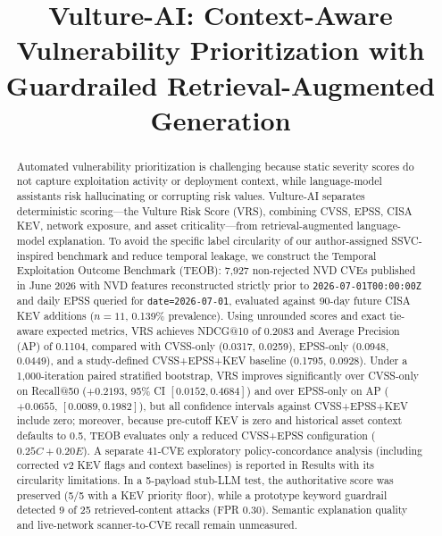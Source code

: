 \documentclass[conference]{IEEEtran}
\begin{document}
\title{Vulture-AI: Context-Aware Vulnerability Prioritization with Guardrailed Retrieval-Augmented Generation}

\author{
}

\maketitle

\begin{abstract}
Automated vulnerability prioritization is challenging because static severity scores do not capture exploitation activity or deployment context, while language-model assistants risk hallucinating or corrupting risk values. Vulture-AI separates deterministic scoring---the Vulture Risk Score (VRS), combining CVSS, EPSS, CISA KEV, network exposure, and asset criticality---from retrieval-augmented language-model explanation. To avoid the specific label circularity of our author-assigned SSVC-inspired benchmark and reduce temporal leakage, we construct the Temporal Exploitation Outcome Benchmark (TEOB): 7,927 non-rejected NVD CVEs published in June 2026 with NVD features reconstructed strictly prior to \texttt{2026-07-01T00:00:00Z} and daily EPSS queried for \texttt{date=2026-07-01}, evaluated against 90-day future CISA KEV additions ($n=11$, 0.139\% prevalence). Using unrounded scores and exact tie-aware expected metrics, VRS achieves NDCG@10 of 0.2083 and Average Precision (AP) of 0.1104, compared with CVSS-only (0.0317, 0.0259), EPSS-only (0.0948, 0.0449), and a study-defined CVSS+EPSS+KEV baseline (0.1795, 0.0928). Under a 1,000-iteration paired stratified bootstrap, VRS improves significantly over CVSS-only on Recall@50 ($+0.2193$, 95\% CI $[0.0152, 0.4684]$) and over EPSS-only on AP ($+0.0655$, $[0.0089, 0.1982]$), but all confidence intervals against CVSS+EPSS+KEV include zero; moreover, because pre-cutoff KEV is zero and historical asset context defaults to 0.5, TEOB evaluates only a reduced CVSS+EPSS configuration ($0.25C + 0.20E$). A separate 41-CVE exploratory policy-concordance analysis (including corrected v2 KEV flags and context baselines) is reported in Results with its circularity limitations. In a 5-payload stub-LLM test, the authoritative score was preserved (5/5 with a KEV priority floor), while a prototype keyword guardrail detected 9 of 25 retrieved-content attacks (FPR 0.30). Semantic explanation quality and live-network scanner-to-CVE recall remain unmeasured.
\end{abstract}
\end{document}
